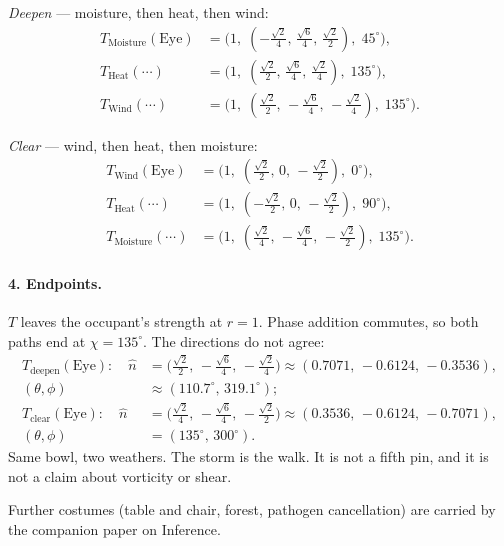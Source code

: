 \documentclass[12pt, a4paper]{article}
\begin{document}
\emph{Deepen} --- moisture, then heat, then wind:
\begin{align*}
T_{\mathrm{Moisture}}(\mathrm{Eye})
&= \bigl(1,\;(-\tfrac{\sqrt{2}}{4},\,\tfrac{\sqrt{6}}{4},\,\tfrac{\sqrt{2}}{2}),\;45^\circ\bigr),\\
T_{\mathrm{Heat}}(\cdots)
&= \bigl(1,\;(\tfrac{\sqrt{2}}{2},\,\tfrac{\sqrt{6}}{4},\,\tfrac{\sqrt{2}}{4}),\;135^\circ\bigr),\\
T_{\mathrm{Wind}}(\cdots)
&= \bigl(1,\;(\tfrac{\sqrt{2}}{2},\,-\tfrac{\sqrt{6}}{4},\,-\tfrac{\sqrt{2}}{4}),\;135^\circ\bigr).
\end{align*}

\emph{Clear} --- wind, then heat, then moisture:
\begin{align*}
T_{\mathrm{Wind}}(\mathrm{Eye})
&= \bigl(1,\;(\tfrac{\sqrt{2}}{2},\,0,\,-\tfrac{\sqrt{2}}{2}),\;0^\circ\bigr),\\
T_{\mathrm{Heat}}(\cdots)
&= \bigl(1,\;(-\tfrac{\sqrt{2}}{2},\,0,\,-\tfrac{\sqrt{2}}{2}),\;90^\circ\bigr),\\
T_{\mathrm{Moisture}}(\cdots)
&= \bigl(1,\;(\tfrac{\sqrt{2}}{4},\,-\tfrac{\sqrt{6}}{4},\,-\tfrac{\sqrt{2}}{2}),\;135^\circ\bigr).
\end{align*}

\paragraph{4. Endpoints.}
$T$ leaves the occupant's strength at $r=1$. Phase addition commutes, so
both paths end at $\chi=135^\circ$. The directions do not agree:
\begin{align*}
T_{\mathrm{deepen}}(\mathrm{Eye}):
\quad
\hat n
&= \bigl(\tfrac{\sqrt{2}}{2},\,-\tfrac{\sqrt{6}}{4},\,-\tfrac{\sqrt{2}}{4}\bigr)
\approx (0.7071,\,-0.6124,\,-0.3536),\\
(\theta,\phi)&\approx(110.7^\circ,\,319.1^\circ);\\[0.4em]
T_{\mathrm{clear}}(\mathrm{Eye}):
\quad
\hat n
&= \bigl(\tfrac{\sqrt{2}}{4},\,-\tfrac{\sqrt{6}}{4},\,-\tfrac{\sqrt{2}}{2}\bigr)
\approx (0.3536,\,-0.6124,\,-0.7071),\\
(\theta,\phi)&=(135^\circ,\,300^\circ).
\end{align*}
Same bowl, two weathers. The storm is the walk. It is not a fifth pin,
and it is not a claim about vorticity or shear.

Further costumes (table and chair, forest, pathogen cancellation) are carried by the companion paper on Inference.
\end{document}

